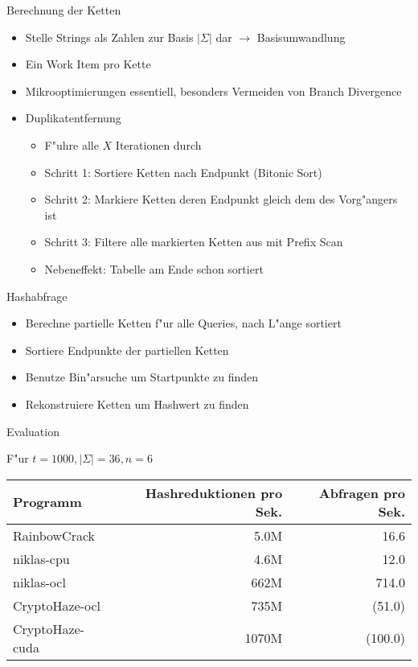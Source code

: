 \documentclass[ngerman,hyperref={pdfpagelabels=true}]{beamer}
\begin{document}
\begin{frame}{Berechnung der Ketten}
  \begin{itemize}
  \item Stelle Strings als Zahlen zur Basis $|\Sigma|$ dar $\rightarrow$ Basisumwandlung
  \item Ein Work Item pro Kette
  \item Mikrooptimierungen essentiell, besonders Vermeiden von Branch Divergence
  \item Duplikatentfernung
  \begin{itemize}
    \item F"uhre alle $X$ Iterationen durch
    \item Schritt 1: Sortiere Ketten nach Endpunkt (Bitonic Sort)
    \item Schritt 2: Markiere Ketten deren Endpunkt gleich dem des Vorg"angers ist
    \item Schritt 3: Filtere alle markierten Ketten aus mit Prefix Scan
    \item Nebeneffekt: Tabelle am Ende schon sortiert
  \end{itemize}
  \end{itemize}
\end{frame}

\begin{frame}{Hashabfrage}
  \begin{itemize}
  \item Berechne partielle Ketten f"ur alle Queries, nach L"ange sortiert
  \item Sortiere Endpunkte der partiellen Ketten
  \item Benutze Bin"arsuche um Startpunkte zu finden
  \item Rekonstruiere Ketten um Hashwert zu finden
  \end{itemize}
\end{frame}

\begin{frame}{Evaluation}

F"ur $t = 1000, |\Sigma| = 36, n = 6$
\\[1em]

  \begin{tabular}[]{l | r | r}
Programm        & Hashreduktionen pro Sek. & Abfragen pro Sek. \\ \hline
RainbowCrack    & 5.0M   &  16.6 \\
niklas-cpu      & 4.6M   &  12.0 \\
niklas-ocl      & 662M   &  714.0 \\
CryptoHaze-ocl  & 735M   &  (51.0) \\
CryptoHaze-cuda & 1070M  &  (100.0)
  \end{tabular}

\end{frame}
\end{document}
